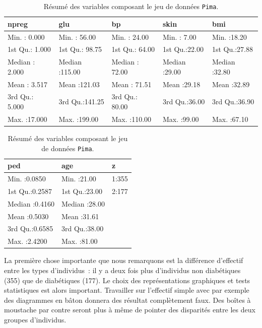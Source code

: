 \documentclass[a4paper,10pt]{report}
\begin{document}
\begin{table}[H]
	\centering
	\captionsetup{justification=centering, margin=2cm}
	\caption{Résumé des variables composant le jeu de données \texttt{Pima}.}
	\begin{tabular}{|l|l|l|l|l}
		\hline
		npreg &      glu &       bp &      skin &      bmi \\
		\hline
		Min.   : 0.000   & Min.   : 56.00   & Min.   : 24.00   & Min.   : 7.00   & Min.   :18.20  \\
		1st Qu.: 1.000   & 1st Qu.: 98.75   & 1st Qu.: 64.00   & 1st Qu.:22.00   & 1st   Qu.:27.88  \\
		Median : 2.000   & Median :115.00   & Median : 72.00   & Median :29.00   & Median :32.80  \\
		Mean   : 3.517   & Mean   :121.03   & Mean   : 71.51   & Mean   :29.18   & Mean  :32.89  \\ 
		3rd Qu.: 5.000   & 3rd Qu.:141.25   & 3rd Qu.: 80.00   & 3rd Qu.:36.00   & 3rd Qu.:36.90  \\
		Max.   :17.000   & Max.   :199.00   & Max.   :110.00   & Max.   :99.00   & Max.   :67.10  \\
	\end{tabular}
	\begin{tabular}{l|l|l|}
		\hline
		ped &      age & z \\ 
		\hline
		Min.   :0.0850   & Min.   :21.00   & 1:355   \\ 
		1st Qu.:0.2587   & 1st Qu.:23.00   & 2:177   \\ 
		Median :0.4160   & Median :28.00   &  \\ 
		Mean   :0.5030   & Mean   :31.61   &  \\ 
		3rd Qu.:0.6585   & 3rd Qu.:38.00   &  \\ 
		Max.   :2.4200   & Max.   :81.00   &  \\ 
	\end{tabular}
\end{table}


La première chose importante que nous remarquons est la différence d'effectif entre les types d'individus~: il y a deux fois plus d'individus non diabétiques (355) que de diabétiques (177). Le choix des représentations graphiques et tests statistiques est alors important. Travailler sur l'effectif simple avec par exemple des diagrammes en bâton donnera des résultat complètement faux. Des boîtes à moustache par contre seront plus à même de pointer des disparités entre les deux groupes d'individus.
\end{document}
